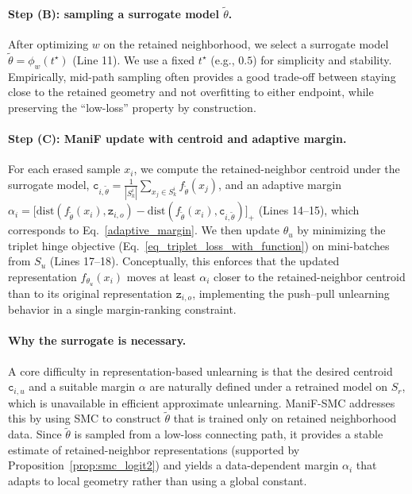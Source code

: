 \paragraph{Step (B): sampling a surrogate model $\tilde{\theta}$.}
After optimizing $w$ on the retained neighborhood, we select a surrogate model $\tilde{\theta}=\phi_w(t^\star)$ (Line 11). We use a fixed $t^\star$ (e.g., $0.5$) for simplicity and stability. Empirically, mid-path sampling often provides a good trade-off between staying close to the retained geometry and not overfitting to either endpoint, while preserving the ``low-loss'' property by construction.

\paragraph{Step (C): ManiF update with centroid and adaptive margin.}
For each erased sample $x_i$, we compute the retained-neighbor centroid under the surrogate model,
$\texttt{c}_{i,\tilde{\theta}}=\frac{1}{|S_k^i|}\sum_{x_j\in S_k^i} f_{\tilde{\theta}}(x_j)$,
and an adaptive margin
$\alpha_i=\big[\mathrm{dist}(f_{\tilde{\theta}}(x_i),\texttt{z}_{i,o})-\mathrm{dist}(f_{\tilde{\theta}}(x_i),\texttt{c}_{i,\tilde{\theta}})\big]_+$
(Lines 14--15), which corresponds to Eq.~\eqref{adaptive_margin}. We then update $\theta_u$ by minimizing the triplet hinge objective (Eq.~\eqref{eq_triplet_loss_with_function}) on mini-batches from $S_u$ (Lines 17--18). Conceptually, this enforces that the updated representation $f_{\theta_u}(x_i)$ moves at least $\alpha_i$ closer to the retained-neighbor centroid than to its original representation $\texttt{z}_{i,o}$, implementing the push--pull unlearning behavior in a single margin-ranking constraint.

\paragraph{Why the surrogate is necessary.}
A core difficulty in representation-based unlearning is that the desired centroid $\texttt{c}_{i,u}$ and a suitable margin $\alpha$ are naturally defined under a retrained model on $S_r$, which is unavailable in efficient approximate unlearning. ManiF-SMC addresses this by using SMC to construct $\tilde{\theta}$ that is trained only on retained neighborhood data. Since $\tilde{\theta}$ is sampled from a low-loss connecting path, it provides a stable estimate of retained-neighbor representations (supported by Proposition~\ref{prop:smc_logit2}) and yields a data-dependent margin $\alpha_i$ that adapts to local geometry rather than using a global constant.

